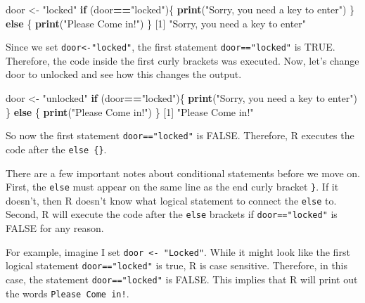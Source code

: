\documentclass[
]{book}
\newenvironment{Shaded}{\begin{snugshade}}{\end{snugshade}}
\newcommand{\ControlFlowTok}[1]{\textcolor[rgb]{0.13,0.29,0.53}{\textbf{#1}}}
\newcommand{\DecValTok}[1]{\textcolor[rgb]{0.00,0.00,0.81}{#1}}
\newcommand{\FunctionTok}[1]{\textcolor[rgb]{0.13,0.29,0.53}{\textbf{#1}}}
\newcommand{\NormalTok}[1]{#1}
\newcommand{\OtherTok}[1]{\textcolor[rgb]{0.56,0.35,0.01}{#1}}
\newcommand{\SpecialCharTok}[1]{\textcolor[rgb]{0.81,0.36,0.00}{\textbf{#1}}}
\newcommand{\StringTok}[1]{\textcolor[rgb]{0.31,0.60,0.02}{#1}}
\begin{document}
\begin{Shaded}
\begin{Highlighting}[]
\NormalTok{door }\OtherTok{\textless{}{-}} \StringTok{"locked"}
\ControlFlowTok{if}\NormalTok{ (door}\SpecialCharTok{==}\StringTok{"locked"}\NormalTok{)\{}
  \FunctionTok{print}\NormalTok{(}\StringTok{"Sorry, you need a key to enter"}\NormalTok{)}
\NormalTok{\} }\ControlFlowTok{else}\NormalTok{ \{}
  \FunctionTok{print}\NormalTok{(}\StringTok{"Please Come in!"}\NormalTok{)}
\NormalTok{\}}
\NormalTok{[}\DecValTok{1}\NormalTok{] }\StringTok{"Sorry, you need a key to enter"}
\end{Highlighting}
\end{Shaded}

Since we set \texttt{door\textless{}-"locked"}, the first statement \texttt{door=="locked"} is TRUE. Therefore, the code inside the first curly brackets was executed. Now, let's change door to unlocked and see how this changes the output.

\begin{Shaded}
\begin{Highlighting}[]
\NormalTok{door }\OtherTok{\textless{}{-}} \StringTok{"unlocked"}
\ControlFlowTok{if}\NormalTok{ (door}\SpecialCharTok{==}\StringTok{"locked"}\NormalTok{)\{}
  \FunctionTok{print}\NormalTok{(}\StringTok{"Sorry, you need a key to enter"}\NormalTok{)}
\NormalTok{\} }\ControlFlowTok{else}\NormalTok{ \{}
  \FunctionTok{print}\NormalTok{(}\StringTok{"Please Come in!"}\NormalTok{)}
\NormalTok{\}}
\NormalTok{[}\DecValTok{1}\NormalTok{] }\StringTok{"Please Come in!"}
\end{Highlighting}
\end{Shaded}

So now the first statement \texttt{door=="locked"} is FALSE. Therefore, R executes the code after the \texttt{else\ \{\}}.

There are a few important notes about conditional statements before we move on. First, the \texttt{else} must appear on the same line as the end curly bracket \texttt{\}}. If it doesn't, then R doesn't know what logical statement to connect the \texttt{else} to. Second, R will execute the code after the \texttt{else} brackets if \texttt{door=="locked"} is FALSE for any reason.

For example, imagine I set \texttt{door\ \textless{}-\ "Locked"}. While it might look like the first logical statement \texttt{door=="locked"} is true, R is case sensitive. Therefore, in this case, the statement \texttt{door=="locked"} is FALSE. This implies that R will print out the words \texttt{Please\ Come\ in!}.
\end{document}
